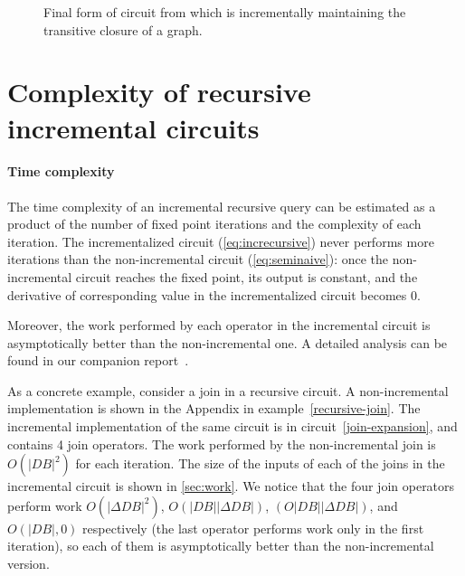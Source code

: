 \begin{figure*}[h]
\caption{Final form of circuit from \label{fig:recursive-example}
which is incrementally maintaining the transitive closure of a graph.}
\end{figure*}

\section{Complexity of recursive incremental circuits}

\paragraph{Time complexity}

The time complexity of an incremental recursive query can be estimated
as a product of the number of fixed point iterations and the
complexity of each iteration. The incrementalized circuit
(\ref{eq:increcursive}) never performs more iterations than the
non-incremental circuit (\ref{eq:seminaive}): once the non-incremental
circuit reaches the fixed point, its output is constant, and the
derivative of corresponding value in the incrementalized circuit
becomes 0.

Moreover, the work performed by each operator in the incremental
circuit is asymptotically better than the non-incremental one.  A
detailed analysis can be found in our companion report~\cite{tr}.

As a concrete example, consider a join in a recursive circuit.  A
non-incremental implementation is shown in the Appendix in
example~\ref{recursive-join}.  The incremental implementation of the
same circuit is in circuit~\ref{join-expansion}, and contains 4 join
operators.  The work performed by the non-incremental join is
$O(|DB|^2)$ for each iteration.  The size of the inputs of each of the
joins in the incremental circuit is shown in \ref{sec:work}.  We
notice that the four join operators perform work $O(|\Delta DB|^2)$,
$O(|DB| |\Delta DB|)$, $(O|DB| |\Delta DB|)$, and $O(|DB|, 0)$
 respectively (the last operator performs
work only in the first iteration), so each of them is asymptotically
better than the non-incremental version.


